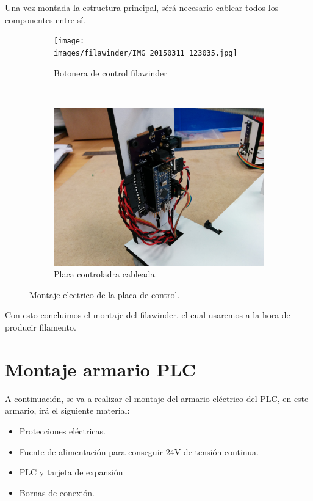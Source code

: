 Una vez montada la estructura principal, sérá necesario cablear todos los componentes entre sí. 

    \begin{figure}[H]
          \centering
        \begin{subfigure}[b]{0.35\textwidth}
                \centering
                \texttt{[image: images/filawinder/IMG\_20150311\_123035.jpg]}
                \caption{Botonera de control filawinder}
                \label{fig:winder_botonera}
        \end{subfigure}
        ~
        \begin{subfigure}[b]{0.35\textwidth}
                \centering
                \includegraphics[width=\textwidth]{images/filawinder/IMG_20150311_131828.jpg}
                \caption{Placa controladra cableada.}
                \label{fig:winder_arduino}
        \end{subfigure}
        \caption{Montaje electrico de la placa de control.}
        \label{fig:winder_montaje_electrio}
\end{figure}

Con esto concluimos el montaje del filawinder, el cual usaremos a la hora de producir filamento.


\section{Montaje armario PLC}
A continuación, se va a realizar el montaje del armario eléctrico del PLC, en este armario, irá el siguiente material:

    \begin{itemize}
        \item{Protecciones eléctricas.}
        \item{Fuente de alimentación para conseguir 24V de tensión continua.}
        \item{PLC y tarjeta de expansión}
        \item{Bornas de conexión.}
    \end{itemize}

